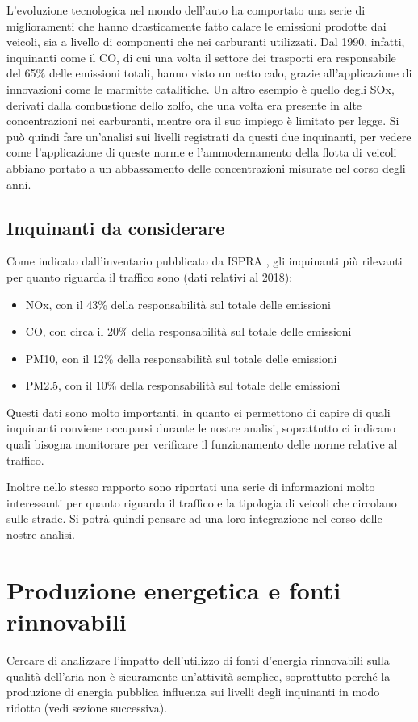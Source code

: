 \documentclass{article}
\begin{document}
L'evoluzione tecnologica nel mondo dell'auto ha comportato una serie di miglioramenti che hanno drasticamente fatto calare le emissioni prodotte dai veicoli, sia a livello di componenti che nei carburanti utilizzati. Dal 1990, infatti, inquinanti come il CO, di cui una volta il settore dei trasporti era responsabile del 65\% delle emissioni totali, hanno visto un netto calo, grazie all'applicazione di innovazioni come le marmitte catalitiche. Un altro esempio è quello degli SOx, derivati dalla combustione dello zolfo, che una volta era presente in alte concentrazioni nei carburanti, mentre ora il suo impiego è limitato per legge. Si può quindi fare un'analisi sui livelli registrati da questi due inquinanti, per vedere come l'applicazione di queste norme e l'ammodernamento della flotta di veicoli abbiano portato a un abbassamento delle concentrazioni misurate nel corso degli anni.

\subsection{Inquinanti da considerare}
Come indicato dall'inventario pubblicato da ISPRA \cite{iir2020}, gli inquinanti più rilevanti per quanto riguarda il traffico sono (dati relativi al 2018): 
\begin{itemize}
	\item NOx, con il 43\% della responsabilità sul totale delle emissioni
	\item CO, con circa il 20\% della responsabilità sul totale delle emissioni
	\item PM10, con il 12\% della responsabilità sul totale delle emissioni
	\item PM2.5, con il 10\% della responsabilità sul totale delle emissioni
\end{itemize}
Questi dati sono molto importanti, in quanto ci permettono di capire di quali inquinanti conviene occuparsi durante le nostre analisi, soprattutto ci indicano quali bisogna monitorare per verificare il funzionamento delle norme relative al traffico. 

Inoltre nello stesso rapporto sono riportati una serie di informazioni molto interessanti per quanto riguarda il traffico e la tipologia di veicoli che circolano sulle strade. Si potrà quindi pensare ad una loro integrazione nel corso delle nostre analisi.


\section{Produzione energetica e fonti rinnovabili}
\label{sec:energia}
Cercare di analizzare l'impatto dell'utilizzo di fonti d'energia rinnovabili sulla qualità dell'aria non è sicuramente un'attività semplice, soprattutto perché la produzione di energia pubblica influenza sui livelli degli inquinanti in modo ridotto (vedi sezione successiva).
\end{document}
